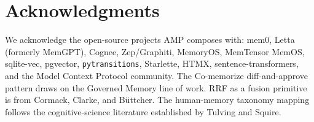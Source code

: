 \documentclass[11pt,letterpaper,twocolumn]{article}
\begin{document}
\section*{Acknowledgments}

We acknowledge the open-source projects AMP composes with: mem0, Letta (formerly MemGPT), Cognee, Zep/Graphiti, MemoryOS, MemTensor MemOS, sqlite-vec, pgvector, \texttt{pytransitions}, Starlette, HTMX, sentence-transformers, and the Model Context Protocol community. The Co-memorize diff-and-approve pattern draws on the Governed Memory line of work. RRF as a fusion primitive is from Cormack, Clarke, and B{\"u}ttcher. The human-memory taxonomy mapping follows the cognitive-science literature established by Tulving and Squire.



\end{document}

